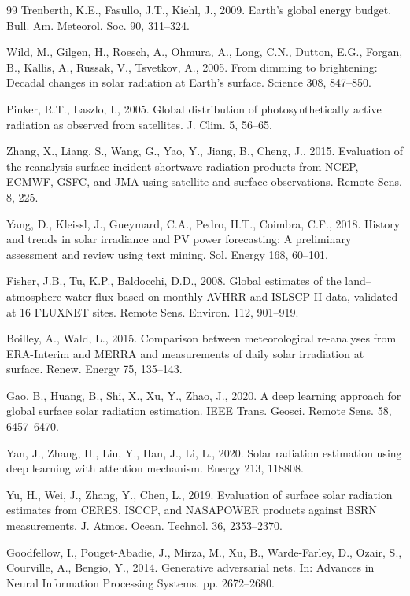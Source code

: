 \documentclass[preprint,12pt]{elsarticle}
\begin{document}
{\begin{thebibliography}{99}
Trenberth, K.E., Fasullo, J.T., Kiehl, J., 2009. Earth's global energy budget. Bull. Am. Meteorol. Soc. 90, 311--324.

Wild, M., Gilgen, H., Roesch, A., Ohmura, A., Long, C.N., Dutton, E.G., Forgan, B., Kallis, A., Russak, V., Tsvetkov, A., 2005. From dimming to brightening: Decadal changes in solar radiation at Earth's surface. Science 308, 847--850.

Pinker, R.T., Laszlo, I., 2005. Global distribution of photosynthetically active radiation as observed from satellites. J. Clim. 5, 56--65.

Zhang, X., Liang, S., Wang, G., Yao, Y., Jiang, B., Cheng, J., 2015. Evaluation of the reanalysis surface incident shortwave radiation products from NCEP, ECMWF, GSFC, and JMA using satellite and surface observations. Remote Sens. 8, 225.

Yang, D., Kleissl, J., Gueymard, C.A., Pedro, H.T., Coimbra, C.F., 2018. History and trends in solar irradiance and PV power forecasting: A preliminary assessment and review using text mining. Sol. Energy 168, 60--101.

Fisher, J.B., Tu, K.P., Baldocchi, D.D., 2008. Global estimates of the land--atmosphere water flux based on monthly AVHRR and ISLSCP-II data, validated at 16 FLUXNET sites. Remote Sens. Environ. 112, 901--919.

Boilley, A., Wald, L., 2015. Comparison between meteorological re-analyses from ERA-Interim and MERRA and measurements of daily solar irradiation at surface. Renew. Energy 75, 135--143.

Gao, B., Huang, B., Shi, X., Xu, Y., Zhao, J., 2020. A deep learning approach for global surface solar radiation estimation. IEEE Trans. Geosci. Remote Sens. 58, 6457--6470.

Yan, J., Zhang, H., Liu, Y., Han, J., Li, L., 2020. Solar radiation estimation using deep learning with attention mechanism. Energy 213, 118808.

Yu, H., Wei, J., Zhang, Y., Chen, L., 2019. Evaluation of surface solar radiation estimates from CERES, ISCCP, and NASAPOWER products against BSRN measurements. J. Atmos. Ocean. Technol. 36, 2353--2370.

Goodfellow, I., Pouget-Abadie, J., Mirza, M., Xu, B., Warde-Farley, D., Ozair, S., Courville, A., Bengio, Y., 2014. Generative adversarial nets. In: Advances in Neural Information Processing Systems. pp. 2672--2680.


\end{thebibliography}}
\end{document}
